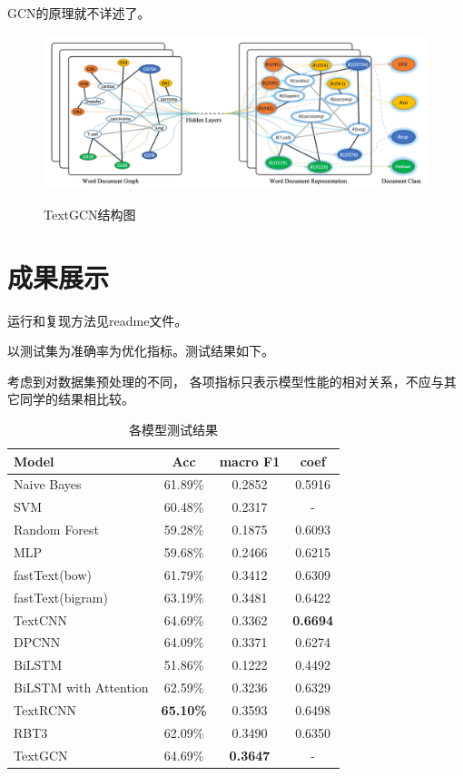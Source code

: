 \documentclass[12pt, UTF8, a4paper]{ctexart}
\begin{document}
GCN的原理就不详述了。

\begin{figure}[htb]
    \centering
    \includegraphics[width=5in, keepaspectratio]{./pic/gcn.jpg}\\
    \caption{TextGCN结构图}
\end{figure}

\section{成果展示}

运行和复现方法见readme文件。

以测试集为准确率为优化指标。测试结果如下。

考虑到对数据集预处理的不同，
各项指标只表示模型性能的相对关系，不应与其它同学的结果相比较。

\begin{table}[htbp]
    \centering
    \caption{各模型测试结果}
\begin{tabular}{lccc}
    \toprule
    Model & Acc & macro F1 & coef \\ 
    \midrule
    Naive Bayes & 61.89\% & 0.2852 & 0.5916 \\ 
    SVM & 60.48\% & 0.2317 & - \\ 
    Random Forest & 59.28\% & 0.1875 & 0.6093 \\ 
    MLP & 59.68\% & 0.2466 & 0.6215 \\ 
    fastText(bow) & 61.79\% & 0.3412 & 0.6309 \\ 
    fastText(bigram) & 63.19\% & 0.3481 & 0.6422 \\ 
    TextCNN & 64.69\% & 0.3362 & \textbf{0.6694} \\ 
    DPCNN & 64.09\% & 0.3371 & 0.6274 \\ 
    BiLSTM & 51.86\% & 0.1222 & 0.4492 \\ 
    BiLSTM with Attention & 62.59\% & 0.3236 & 0.6329 \\
    TextRCNN & \textbf{65.10\%} & 0.3593 & 0.6498 \\ 
    RBT3 & 62.09\% & 0.3490 & 0.6350 \\ 
    TextGCN & 64.69\% & \textbf{0.3647} & -\\
    \bottomrule
    \end{tabular}
\end{table}
\end{document}
